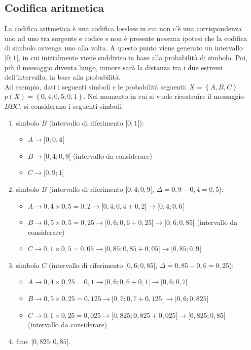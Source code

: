 \subsection{Codifica aritmetica}
La codifica aritmetica è una codifica lossless in cui non c'è una corrispondenza uno ad uno tra sorgente e codice e non è presente nessuna ipotesi che
la codifica di simbolo avvenga uno alla volta. A questo punto viene generato un intervallo $[0;1[$, in cui inizialmente viene suddiviso in base alla
probabilità di simbolo. Poi, più il messaggio diventa lungo, minore sarà la distanza tra i due estremi dell'intervallo, in base alla probabilità.\\
Ad esempio, dati i seguenti simboli e le probabilità seguenti: $X=\left\{A,B,C\right\}$ $p(X)=\left\{0,4;0,5;0,1\right\}$. Nel momento in cui si vuole ricostruire il messaggio
$BBC$, si considerano i seguenti simboli:
\begin{enumerate}
    \item simbolo $B$ (intervallo di riferimento $[0;1[$):
    \begin{itemize}
        \item $A \rightarrow [0; 0,4[$
        \item $B \rightarrow [0,4; 0,9[$ (intervallo da considerare)
        \item $C \rightarrow [0,9; 1[$
    \end{itemize}
    \item simbolo $B$ (intervallo di riferimento $[0,4; 0,9[$, $\Delta=0,9-0,4=0,5$):
    \begin{itemize}
        \item $A \rightarrow 0,4\times0,5=0,2 \rightarrow [0,4; 0,4+0,2[ \rightarrow [0,4; 0,6[$
        \item $B \rightarrow 0,5\times0,5=0,25 \rightarrow [0,6; 0,6+0,25[ \rightarrow [0,6; 0,85[$ (intervallo da considerare)
        \item $C \rightarrow 0,1\times0,5=0,05 \rightarrow [0,85; 0,85+0,05[ \rightarrow [0,85; 0,9[$
    \end{itemize}
    \item simbolo $C$ (intervallo di riferimento $[0,6; 0,85[$, $\Delta=0,85-0,6=0,25$):
    \begin{itemize}
        \item $A \rightarrow 0,4\times0,25=0,1 \rightarrow [0,6; 0,6+0,1[ \rightarrow [0,6; 0,7[$
        \item $B \rightarrow 0,5\times0,25=0,125 \rightarrow [0,7; 0,7+0,125[ \rightarrow [0,6; 0,825[$ 
        \item $C \rightarrow 0,1\times0,25=0,025 \rightarrow [0,825; 0,825+0,025[ \rightarrow [0,825; 0,85[$ (intervallo da considerare)
    \end{itemize}
    \item fine: $[0,825; 0,85[$.
\end{enumerate}
